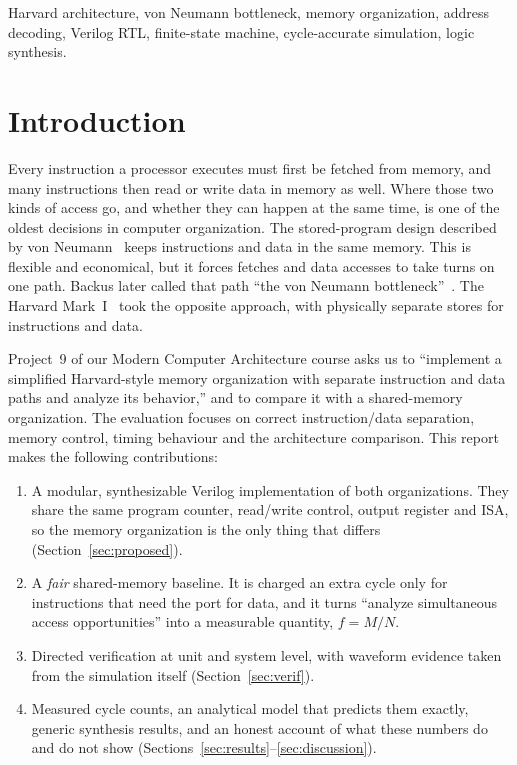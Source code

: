 \documentclass[conference]{IEEEtran}
\begin{document}
\begin{IEEEkeywords}
Harvard architecture, von Neumann bottleneck, memory organization, address decoding, Verilog RTL, finite-state machine, cycle-accurate simulation, logic synthesis.
\end{IEEEkeywords}

\section{Introduction}
Every instruction a processor executes must first be fetched from memory, and many instructions then read or write data in memory as well. Where those two kinds of access go, and whether they can happen at the same time, is one of the oldest decisions in computer organization. The stored-program design described by von Neumann~\cite{vonneumann} keeps instructions and data in the same memory. This is flexible and economical, but it forces fetches and data accesses to take turns on one path. Backus later called that path ``the von Neumann bottleneck''~\cite{backus}. The Harvard Mark~I~\cite{aiken} took the opposite approach, with physically separate stores for instructions and data.

Project~9 of our Modern Computer Architecture course asks us to ``implement a simplified Harvard-style memory organization with separate instruction and data paths and analyze its behavior,'' and to compare it with a shared-memory organization. The evaluation focuses on correct instruction/data separation, memory control, timing behaviour and the architecture comparison. This report makes the following contributions:
\begin{enumerate}
\item A modular, synthesizable Verilog implementation of both organizations. They share the same program counter, read/write control, output register and ISA, so the memory organization is the only thing that differs (Section~\ref{sec:proposed}).
\item A \emph{fair} shared-memory baseline. It is charged an extra cycle only for instructions that need the port for data, and it turns ``analyze simultaneous access opportunities'' into a measurable quantity, $f=M/N$.
\item Directed verification at unit and system level, with waveform evidence taken from the simulation itself (Section~\ref{sec:verif}).
\item Measured cycle counts, an analytical model that predicts them exactly, generic synthesis results, and an honest account of what these numbers do and do not show (Sections~\ref{sec:results}--\ref{sec:discussion}).
\end{enumerate}
\end{document}
